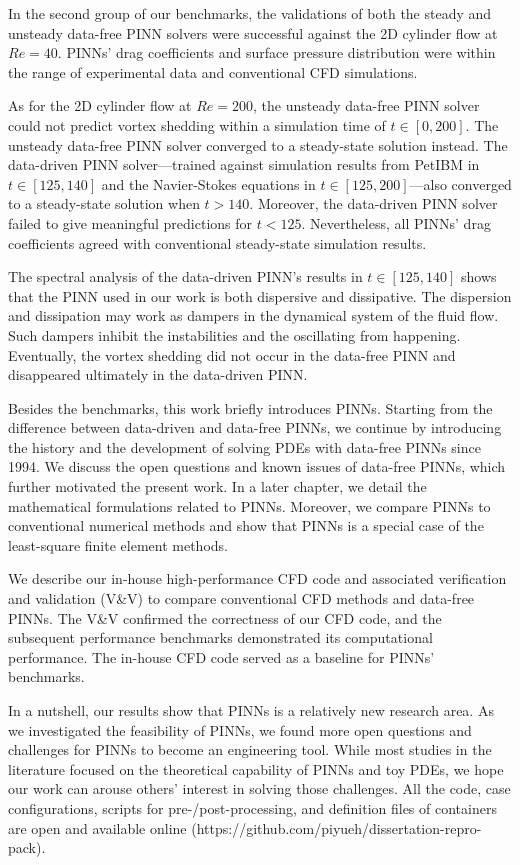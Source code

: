 {In the second group of our benchmarks, the validations of both the steady and unsteady data-free PINN solvers were successful against the 2D cylinder flow at $Re=40$.
PINNs' drag coefficients and surface pressure distribution were within the range of experimental data and conventional CFD simulations.

As for the 2D cylinder flow at $Re=200$, the unsteady data-free PINN solver could not predict vortex shedding within a simulation time of $t\in[0, 200]$.
The unsteady data-free PINN solver converged to a steady-state solution instead.
The data-driven PINN solver---trained against simulation results from PetIBM in $t \in [125, 140]$ and the Navier-Stokes equations in $t\in[125, 200]$---also converged to a steady-state solution when $t > 140$.
Moreover, the data-driven PINN solver failed to give meaningful predictions for $t<125$.
Nevertheless, all PINNs' drag coefficients agreed with conventional steady-state simulation results.

The spectral analysis of the data-driven PINN's results in $t \in [125, 140]$ shows that the PINN used in our work is both dispersive and dissipative.
The dispersion and dissipation may work as dampers in the dynamical system of the fluid flow.
Such dampers inhibit the instabilities and the oscillating from happening.
Eventually, the vortex shedding did not occur in the data-free PINN and disappeared ultimately in the data-driven PINN.

Besides the benchmarks, this work briefly introduces PINNs.
Starting from the difference between data-driven and data-free PINNs, we continue by introducing the history and the development of solving PDEs with data-free PINNs since 1994.
We discuss the open questions and known issues of data-free PINNs, which further motivated the present work.
In a later chapter, we detail the mathematical formulations related to PINNs.
Moreover, we compare PINNs to conventional numerical methods and show that PINNs is a special case of the least-square finite element methods.

We describe our in-house high-performance CFD code and associated verification and validation (V\&V) to compare conventional CFD methods and data-free PINNs.
The V\&V confirmed the correctness of our CFD code, and the subsequent performance benchmarks demonstrated its computational performance.
The in-house CFD code served as a baseline for PINNs' benchmarks.

In a nutshell, our results show that PINNs is a relatively new research area.
As we investigated the feasibility of PINNs, we found more open questions and challenges for PINNs to become an engineering tool.
While most studies in the literature focused on the theoretical capability of PINNs and toy PDEs, we hope our work can arouse others' interest in solving those challenges.
All the code, case configurations, scripts for pre-/post-processing, and definition files of containers are open and available online (https://github.com/piyueh/dissertation-repro-pack).
}
